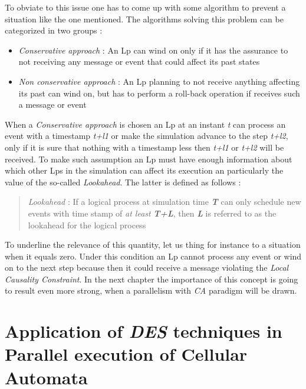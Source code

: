 \documentclass[12pt,a4paper,fleqn]{report}
\begin{document}
To obviate to this issue one has to come up with some algorithm to prevent a situation like the one mentioned. The algorithms solving this problem can be categorized in two groups : 
\begin{itemize}
\item
\textit{Conservative approach} : An Lp can wind on only if it has the assurance to not receiving any message or event that could affect its past states
\item
\textit{Non conservative approach} :  An Lp planning to not receive anything affecting its past can wind on, but has to perform a roll-back operation if receives such a message or event
\end{itemize}
When a \textit{Conservative approach} is chosen an Lp at an instant \textit{t} can process an event with a timestamp \textit{t+l1} or make the simulation advance to the step \textit{t+l2}, only if it is sure that nothing with a timestamp less then \textit{t+l1} or \textit{t+l2} will be received. To make such assumption an Lp must have enough information about which other Lps in the simulation can affect its execution an particularly the value of the so-called \textit{Lookahead}. The latter is defined as follows :
\begin{quotation}
\textit{Lookahead} : If a logical process at simulation time \textit{\textbf{T}} can only schedule new events with time stamp of \textit{at least} \textit{\textbf{T+L}}, then \textit{\textbf{L}} is referred to as the lookahead for the logical process \cite{0}
\end{quotation}
To underline the relevance of this quantity, let us thing for instance to a situation when it equals zero. Under this condition an Lp cannot process any event or wind on to the next step because then it could receive a message violating the \textit{Local Causality Constraint}. In the next chapter the importance of this concept is going to result even more strong, when a parallelism with \textit{CA} paradigm will be drawn. 
\newpage
\chapter{Application of \textit{DES} techniques in Parallel execution of Cellular Automata}
\end{document}
